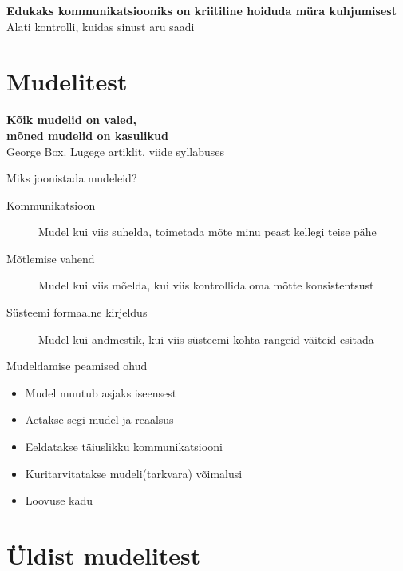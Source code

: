 \documentclass{beamer}
\begin{document}
\begin{frame}[fragile]
	\begin{center}
		\LARGE{\textbf{Edukaks kommunikatsiooniks on kriitiline hoiduda müra kuhjumisest}}
		\\[4cm]
		\small{Alati kontrolli, kuidas sinust aru saadi}
	\end{center}
\end{frame}


\section{Mudelitest}
\begin{frame}[fragile]
	\begin{center}
		\LARGE{\textbf{Kõik mudelid on valed, \\mõned mudelid on kasulikud}}
		\\[4cm]
		\small{George Box. Lugege artiklit, viide syllabuses}
	\end{center}
\end{frame}

\begin{frame}{Miks joonistada mudeleid?}
\begin{description}
	\item[Kommunikatsioon] Mudel kui viis suhelda, toimetada mõte minu peast kellegi teise pähe
	\item[Mõtlemise vahend] Mudel kui viis mõelda, kui viis kontrollida oma mõtte konsistentsust
	\item[Süsteemi formaalne kirjeldus] Mudel kui andmestik, kui viis süsteemi kohta rangeid väiteid esitada
\end{description}
	
\end{frame}

\begin{frame}{Mudeldamise peamised ohud}
	\begin{itemize}
		\item Mudel muutub asjaks iseensest
		\item Aetakse segi mudel ja reaalsus
		\item Eeldatakse täiuslikku kommunikatsiooni
		\item Kuritarvitatakse mudeli(tarkvara) võimalusi
		\item Loovuse kadu
	\end{itemize}
\end{frame}

\section{Üldist mudelitest}
\end{document}
